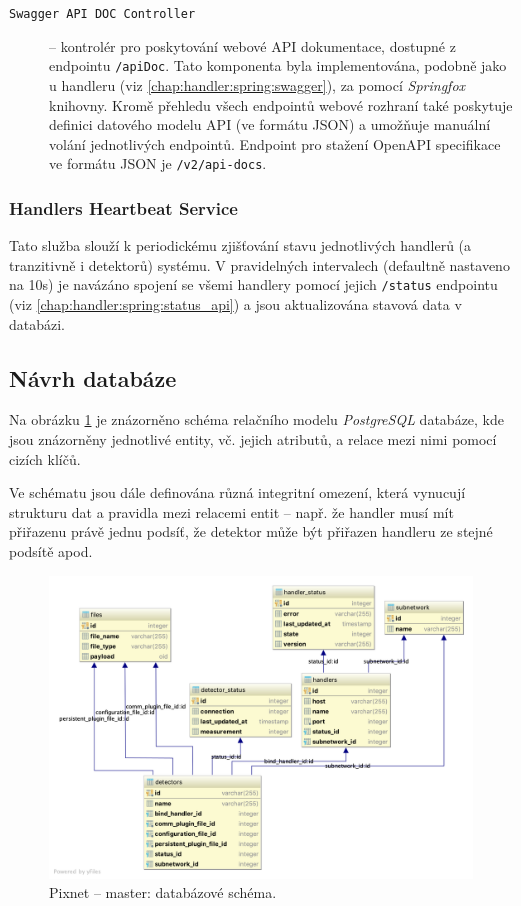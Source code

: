 \begin{description}
    \item[\texttt{Swagger API DOC Controller}] -- kontrolér pro poskytování webové API dokumentace, dostupné z endpointu \texttt{/apiDoc}. Tato komponenta byla implementována, podobně jako u handleru (viz \ref{chap:handler:spring:swagger}), za pomocí \textit{Springfox} \cite{springfox} knihovny. Kromě přehledu všech endpointů webové rozhraní také poskytuje definici datového modelu API (ve formátu JSON) a umožňuje manuální volání jednotlivých endpointů. Endpoint pro stažení Open\-API specifikace ve formátu JSON je \texttt{/v2/api-docs}.
\end{description}

\subsubsection{Handlers Heartbeat Service}
Tato služba slouží k periodickému zjišťování stavu jednotlivých handlerů (a tranzitivně i detektorů) systému. V pravidelných intervalech (defaultně nastaveno na \unit{10}{s}) je navázáno spojení se všemi handlery pomocí jejich \texttt{/status} endpointu (viz \ref{chap:handler:spring:status_api}) a jsou aktualizována stavová data v databázi.

\subsection{Návrh databáze}\label{chap:master:backend:db}
Na obrázku \ref{fig:master:db_schema} je znázorněno schéma relačního modelu \textit{PostgreSQL} databáze, kde jsou znázorněny jednotlivé entity, vč. jejich atributů, a relace mezi nimi pomocí cizích klíčů.

Ve schématu jsou dále definována různá integritní omezení, která vynucují strukturu dat a pravidla mezi relacemi entit -- např. že handler musí mít přiřazenu právě jednu podsíť, že detektor může být přiřazen handleru ze stejné podsítě apod.

\begin{figure}[h]
	\begin{center}
		\vspace*{0.4cm}
		\includegraphics[width=15cm]{figures/master_db.png}
		\caption{Pixnet -- master: databázové schéma.}
		\label{fig:master:db_schema}
	\end{center}
\end{figure}

